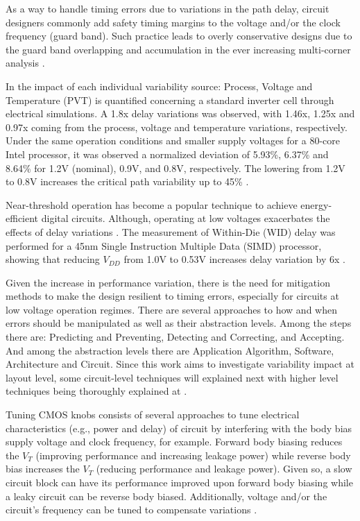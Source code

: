\documentclass[diss,pgmicro,english]{iiufrgs}
\begin{document}
As a way to handle timing errors due to variations in the path delay, circuit designers commonly add safety timing margins to the voltage and/or the clock frequency (guard band). Such practice leads to overly conservative designs due to the guard band overlapping and accumulation in the ever increasing multi-corner analysis \cite{austin2005opportunities}.

In \cite{jeong2009impact} the impact of each individual variability source: Process, Voltage and Temperature (PVT) is quantified concerning a standard inverter cell through electrical simulations. A 1.8x delay variations was observed, with 1.46x, 1.25x and 0.97x coming from the process, voltage and temperature variations, respectively. Under the same operation conditions and smaller supply voltages for a 80-core Intel processor, it was observed a normalized deviation of 5.93\%, 6.37\% and 8.64\% for 1.2V (nominal), 0.9V, and 0.8V, respectively. The lowering from 1.2V to 0.8V increases the critical path variability up to 45\% \cite{dighe2011within}.

Near-threshold operation has become a popular technique to achieve energy-efficient digital circuits. Although, operating at low voltages exacerbates the effects of delay variations \cite{jeon2012design, dreslinski2010near, rithe2011effect, kakoee2012variation, pawlowski2012530mv}.
The measurement of Within-Die (WID) delay was performed for a 45nm Single Instruction Multiple Data (SIMD) processor, showing that reducing $V_{DD}$ from 1.0V to 0.53V increases delay variation by 6x \cite{pawlowski2012530mv}.

Given the increase in performance variation, there is the need for mitigation methods to make the design resilient to timing errors, especially for circuits at low voltage operation regimes. There are several approaches to how and when errors should be manipulated as well as their abstraction levels. Among the steps there are: Predicting and Preventing, Detecting and Correcting, and Accepting. And among the abstraction levels there are Application Algorithm, Software, Architecture and Circuit. Since this work aims to investigate variability impact at layout level, some circuit-level techniques will explained next with higher level techniques being thoroughly explained at \cite{rahimi2016variability}.

Tuning CMOS knobs consists of several approaches to tune electrical characteristics (e.g., power and delay) of circuit by interfering with the body bias supply voltage and clock frequency, for example. Forward body biasing reduces the $V_T$ (improving performance and increasing leakage power) while reverse body bias increases the $V_T$ (reducing performance and leakage power). Given so, a slow circuit block can have its performance improved upon forward body biasing while a leaky circuit can be reverse body biased. Additionally, voltage and/or the circuit's frequency can be tuned to compensate variations \cite{dighe2011within, tschanz2002adaptive, borkar2004design}.
\end{document}
